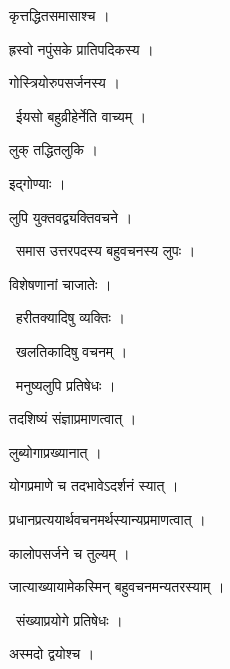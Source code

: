 \documentclass[10pt, openany, oneside]{book}
\begin{document}
\noindent कृत्तद्धितसमासाश्च ।

\noindent ह्रस्वो नपुंसके प्रातिपदिकस्य ।

\noindent गोस्त्रियोरुपसर्जनस्य ।

\par\noindent\hspace{1.5em}{\vps वा॰}~{\qt ईयसो बहुव्रीहेर्नेति वाच्यम् ।}

\noindent लुक् तद्धितलुकि ।

\noindent इद्गोण्याः ।

\noindent लुपि युक्तवद्व्यक्तिवचने ।

\par\noindent\hspace{1.5em}{\vps वा॰}~{\qt समास उत्तरपदस्य बहुवचनस्य लुपः ।}

\noindent विशेषणानां चाजातेः ।

\par\noindent\hspace{1.5em}{\vps वा॰}~{\qt हरीतक्यादिषु व्यक्तिः ।}

\par\noindent\hspace{1.5em}{\vps वा॰}~{\qt खलतिकादिषु वचनम् ।}

\par\noindent\hspace{1.5em}{\vps वा॰}~{\qt मनुष्यलुपि प्रतिषेधः ।}

\noindent तदशिष्यं संज्ञाप्रमाणत्वात् ।

\noindent लुब्योगाप्रख्यानात् ।

\noindent योगप्रमाणे च तदभावेऽदर्शनं स्यात् ।

\noindent प्रधानप्रत्ययार्थवचनमर्थस्यान्यप्रमाणत्वात् ।

\noindent कालोपसर्जने च तुल्यम् ।

\noindent जात्याख्यायामेकस्मिन् बहुवचनमन्यतरस्याम् ।

\par\noindent\hspace{1.5em}{\vps वा॰}~{\qt संख्याप्रयोगे प्रतिषेधः ।}

\noindent अस्मदो द्वयोश्च ।
\end{document}
